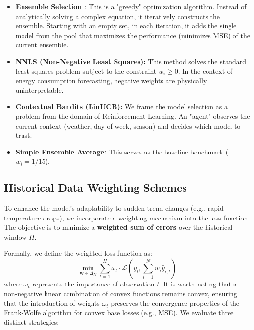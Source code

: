 \documentclass[journal,article,submit,pdftex,moreauthors]{Definitions/mdpi}
\begin{document}
\begin{itemize}
    \item \textbf{Ensemble Selection} \citep{ref_caruana}: This is a "greedy" optimization algorithm. Instead of analytically solving a complex equation, it iteratively constructs the ensemble. Starting with an empty set, in each iteration, it adds the single model from the pool that maximizes the performance (minimizes MSE) of the current ensemble.
    \item \textbf{NNLS (Non-Negative Least Squares):} This method solves the standard least squares problem subject to the constraint $w_i \ge 0$. In the context of energy consumption forecasting, negative weights are physically uninterpretable.
    \item \textbf{Contextual Bandits (LinUCB):} We frame the model selection as a problem from the domain of Reinforcement Learning. An "agent" observes the current context (weather, day of week, season) and decides which model to trust.
    \item \textbf{Simple Ensemble Average:} This serves as the baseline benchmark ($w_i = 1/15$).
\end{itemize}

\subsection{Historical Data Weighting Schemes}
To enhance the model's adaptability to sudden trend changes (e.g., rapid temperature drops), we incorporate a weighting mechanism into the loss function. The objective is to minimize a \textbf{weighted sum of errors} over the historical window $H$.

Formally, we define the weighted loss function as:
\begin{equation}
    \min_{\mathbf{w} \in \Delta_N} \sum_{t=1}^H \omega_t \cdot \mathcal{L}\left(y_t, \sum_{i=1}^N w_i \hat{y}_{i,t}\right)
\end{equation}
where $\omega_t$ represents the importance of observation $t$. It is worth noting that a non-negative linear combination of convex functions remains convex, ensuring that the introduction of weights $\omega_t$ preserves the convergence properties of the Frank-Wolfe algorithm for convex base losses (e.g., MSE). We evaluate three distinct strategies:
\end{document}
